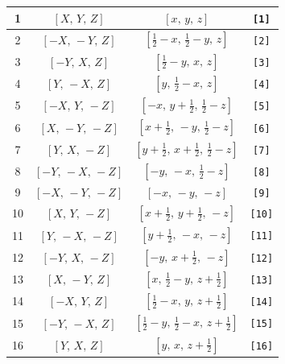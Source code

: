 \documentclass[fleqn,8pt]{jsarticle}
\begin{document}
\begin{longtable}{cccc}
1 & $\left[ X,\, Y,\, Z \right]$ & $\left[ x,\, y,\, z \right]$ & {\tt [1]} \\ \hline
2 & $\left[ - X,\, - Y,\, Z \right]$ & $\left[ \frac{1}{2} - x,\, \frac{1}{2} - y,\, z \right]$ & {\tt [2]} \\ \hline
3 & $\left[ - Y,\, X,\, Z \right]$ & $\left[ \frac{1}{2} - y,\, x,\, z \right]$ & {\tt [3]} \\ \hline
4 & $\left[ Y,\, - X,\, Z \right]$ & $\left[ y,\, \frac{1}{2} - x,\, z \right]$ & {\tt [4]} \\ \hline
5 & $\left[ - X,\, Y,\, - Z \right]$ & $\left[ - x,\, y + \frac{1}{2},\, \frac{1}{2} - z \right]$ & {\tt [5]} \\ \hline
6 & $\left[ X,\, - Y,\, - Z \right]$ & $\left[ x + \frac{1}{2},\, - y,\, \frac{1}{2} - z \right]$ & {\tt [6]} \\ \hline
7 & $\left[ Y,\, X,\, - Z \right]$ & $\left[ y + \frac{1}{2},\, x + \frac{1}{2},\, \frac{1}{2} - z \right]$ & {\tt [7]} \\ \hline
8 & $\left[ - Y,\, - X,\, - Z \right]$ & $\left[ - y,\, - x,\, \frac{1}{2} - z \right]$ & {\tt [8]} \\ \hline
9 & $\left[ - X,\, - Y,\, - Z \right]$ & $\left[ - x,\, - y,\, - z \right]$ & {\tt [9]} \\ \hline
10 & $\left[ X,\, Y,\, - Z \right]$ & $\left[ x + \frac{1}{2},\, y + \frac{1}{2},\, - z \right]$ & {\tt [10]} \\ \hline
11 & $\left[ Y,\, - X,\, - Z \right]$ & $\left[ y + \frac{1}{2},\, - x,\, - z \right]$ & {\tt [11]} \\ \hline
12 & $\left[ - Y,\, X,\, - Z \right]$ & $\left[ - y,\, x + \frac{1}{2},\, - z \right]$ & {\tt [12]} \\ \hline
13 & $\left[ X,\, - Y,\, Z \right]$ & $\left[ x,\, \frac{1}{2} - y,\, z + \frac{1}{2} \right]$ & {\tt [13]} \\ \hline
14 & $\left[ - X,\, Y,\, Z \right]$ & $\left[ \frac{1}{2} - x,\, y,\, z + \frac{1}{2} \right]$ & {\tt [14]} \\ \hline
15 & $\left[ - Y,\, - X,\, Z \right]$ & $\left[ \frac{1}{2} - y,\, \frac{1}{2} - x,\, z + \frac{1}{2} \right]$ & {\tt [15]} \\ \hline
16 & $\left[ Y,\, X,\, Z \right]$ & $\left[ y,\, x,\, z + \frac{1}{2} \right]$ & {\tt [16]} \\
\end{longtable}
\end{document}
